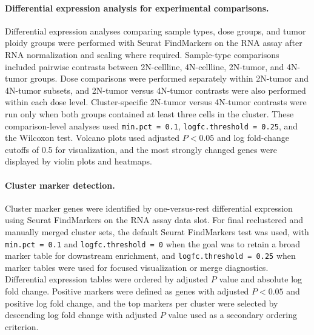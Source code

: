 \documentclass[11pt]{article}
\begin{document}
\paragraph{Differential expression analysis for experimental comparisons.}
Differential expression analyses comparing sample types, dose groups, and tumor ploidy groups were performed with Seurat FindMarkers on the RNA assay after RNA normalization and scaling where required. Sample-type comparisons included pairwise contrasts between 2N-cellline, 4N-cellline, 2N-tumor, and 4N-tumor groups. Dose comparisons were performed separately within 2N-tumor and 4N-tumor subsets, and 2N-tumor versus 4N-tumor contrasts were also performed within each dose level. Cluster-specific 2N-tumor versus 4N-tumor contrasts were run only when both groups contained at least three cells in the cluster. These comparison-level analyses used \texttt{min.pct = 0.1}, \texttt{logfc.threshold = 0.25}, and the Wilcoxon test. Volcano plots used adjusted \(P < 0.05\) and log fold-change cutoffs of 0.5 for visualization, and the most strongly changed genes were displayed by violin plots and heatmaps.

\paragraph{Cluster marker detection.}
Cluster marker genes were identified by one-versus-rest differential expression using Seurat FindMarkers on the RNA assay data slot. For final reclustered and manually merged cluster sets, the default Seurat FindMarkers test was used, with \texttt{min.pct = 0.1} and \texttt{logfc.threshold = 0} when the goal was to retain a broad marker table for downstream enrichment, and \texttt{logfc.threshold = 0.25} when marker tables were used for focused visualization or merge diagnostics. Differential expression tables were ordered by adjusted \(P\) value and absolute log fold change. Positive markers were defined as genes with adjusted \(P < 0.05\) and positive log fold change, and the top markers per cluster were selected by descending log fold change with adjusted \(P\) value used as a secondary ordering criterion.
\end{document}
